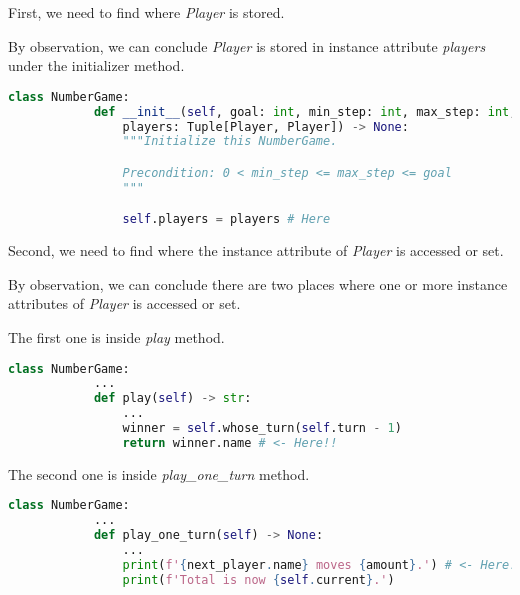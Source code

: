 \documentclass[12pt]{article}
\begin{document}
\begin{enumerate}[1.]
\begin{itemize}
        \bigskip

        First, we need to find where \textit{Player} is stored.

        \bigskip

        By observation, we can conclude \textit{Player} is stored in
        instance attribute \textit{players} under the initializer method.

        \begin{lstlisting}[language=Python]
        class NumberGame:
            def __init__(self, goal: int, min_step: int, max_step: int,
                players: Tuple[Player, Player]) -> None:
                """Initialize this NumberGame.

                Precondition: 0 < min_step <= max_step <= goal
                """

                self.players = players # Here
        \end{lstlisting}

        \bigskip

        Second, we need to find where the instance attribute of \textit{Player} is accessed or set.

        \bigskip

        By observation, we can conclude there are two places where one or more instance
        attributes of \textit{Player} is accessed or set.

        \bigskip

        The first one is inside \textit{play} method.

        \begin{lstlisting}[language=Python]
        class NumberGame:
            ...
            def play(self) -> str:
                ...
                winner = self.whose_turn(self.turn - 1)
                return winner.name # <- Here!!
        \end{lstlisting}

        \bigskip

        The second one is inside \textit{play\_one\_turn} method.

        \begin{lstlisting}[language=Python]
        class NumberGame:
            ...
            def play_one_turn(self) -> None:
                ...
                print(f'{next_player.name} moves {amount}.') # <- Here!!
                print(f'Total is now {self.current}.')
        \end{lstlisting}

        \bigskip


\end{itemize}
\end{enumerate}
\end{document}
